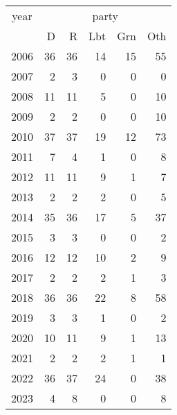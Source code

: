 \footnotesize\begin{tabular}[t]{lrrrrr}
\toprule
\multicolumn{1}{c}{year} & \multicolumn{5}{c}{party} \\
\cmidrule(l{3pt}r{3pt}){1-1} \cmidrule(l{3pt}r{3pt}){2-6}
  & D & R & Lbt & Grn & Oth\\
\midrule
2006 & 36 & 36 & 14 & 15 & 55\\
2007 & 2 & 3 & 0 & 0 & 0\\
2008 & 11 & 11 & 5 & 0 & 10\\
2009 & 2 & 2 & 0 & 0 & 10\\
2010 & 37 & 37 & 19 & 12 & 73\\
2011 & 7 & 4 & 1 & 0 & 8\\
2012 & 11 & 11 & 9 & 1 & 7\\
2013 & 2 & 2 & 2 & 0 & 5\\
2014 & 35 & 36 & 17 & 5 & 37\\
2015 & 3 & 3 & 0 & 0 & 2\\
2016 & 12 & 12 & 10 & 2 & 9\\
2017 & 2 & 2 & 2 & 1 & 3\\
2018 & 36 & 36 & 22 & 8 & 58\\
2019 & 3 & 3 & 1 & 0 & 2\\
2020 & 10 & 11 & 9 & 1 & 13\\
2021 & 2 & 2 & 2 & 1 & 1\\
2022 & 36 & 37 & 24 & 0 & 38\\
2023 & 4 & 8 & 0 & 0 & 8\\
\bottomrule
\end{tabular}
